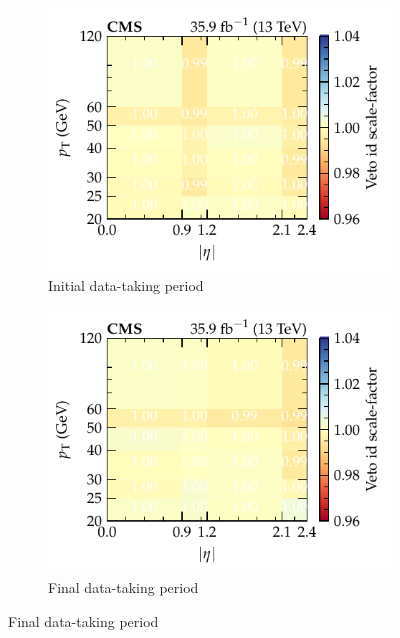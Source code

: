 \begin{figure}[htbp]
    \centering
    \begin{subfigure}[b]{0.49\textwidth}
        \centering
        \includegraphics{chapters/041_corrections/images/efficiencies/objects/muons/muon_id_loose_runbf.pdf}
        \caption{Initial data-taking period}
        \label{subfiga:muon-id-scale-factors}
    \end{subfigure}
    \hfill
    \begin{subfigure}[b]{0.49\textwidth}
        \centering
        \includegraphics{chapters/041_corrections/images/efficiencies/objects/muons/muon_id_loose_rungh.pdf}
        \caption{Final data-taking period}
        \label{subfigb:muon-id-scale-factors}
    \end{subfigure}

\end{figure}
